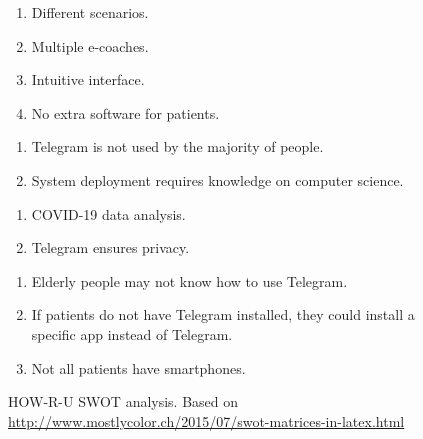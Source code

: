 \documentclass[12pt,english]{article}
\begin{document}
\begin{figure}[H]
  \centering
    \begin{tcbraster}[raster columns=2, boxrule=0mm, arc=0mm]
  \begin{tcolorbox}[equal height group=A, size=fbox, colback=swotS!60, colframe=swotS!80!black, title=\textsc{strengths}]
  \begin{enumerate}
  \item Different scenarios.
  \item Multiple e-coaches.
  \item Intuitive interface.
  \item No extra software for patients.
  \end{enumerate}
  \end{tcolorbox}
  \begin{tcolorbox}[equal height group=A, size=fbox, colback=swotW!60, colframe=swotW!80!black, title=\textsc{weaknesses}]
  \begin{enumerate}
  \item Telegram is not used by the majority of people.
  \item System deployment requires knowledge on computer science.
  \end{enumerate}
  \end{tcolorbox}
  \begin{tcolorbox}[equal height group=B, size=fbox, colback=swotO!60, colframe=swotO!80!black, title=\textsc{opportunities}]
  \begin{enumerate}
  \item COVID-19 data analysis.
  \item Telegram ensures privacy.
  \end{enumerate}
  \end{tcolorbox}
  \begin{tcolorbox}[equal height group=B, size=fbox, colback=swotT!60, colframe=swotT!80!black, title=\textsc{threats}]
  \begin{enumerate}
  \item Elderly people may not know how to use Telegram.
  \item If patients do not have Telegram installed, they could install a specific app instead of Telegram.
  \item Not all patients have smartphones.
  \end{enumerate}
  \end{tcolorbox}
  \end{tcbraster}
  \caption{HOW-R-U SWOT analysis. Based on \href{http://www.mostlycolor.ch/2015/07/swot-matrices-in-latex.html}{http://www.mostlycolor.ch/2015/07/swot-matrices-in-latex.html}}
\end{figure}
\end{document}
